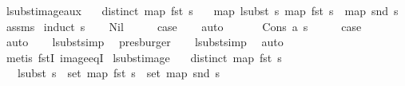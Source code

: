 \begin{isabellebody}
\isamarkupfalse%
%
\endisatagproof
{\isafoldproof}%
%
\isadelimproof
\isanewline
%
\endisadelimproof
\isanewline
\isanewline
{}\isamarkupfalse%
\ lsubst{\isacharunderscore}{\kern0pt}image{\isacharunderscore}{\kern0pt}aux{\isacharcolon}{\kern0pt}\isanewline
\ \ \ {\isachardoublequoteopen}distinct\ {\isacharparenleft}{\kern0pt}map\ fst\ s{\isacharparenright}{\kern0pt}{\isachardoublequoteclose}\isanewline
\ \ \ {\isachardoublequoteopen}map\ {\isacharparenleft}{\kern0pt}lsubst\ s{\isacharparenright}{\kern0pt}\ {\isacharparenleft}{\kern0pt}map\ fst\ s{\isacharparenright}{\kern0pt}\ {\isacharequal}{\kern0pt}\ map\ snd\ s{\isachardoublequoteclose}\isanewline
%
\isadelimproof
%
\endisadelimproof
%
\isatagproof
{}\isamarkupfalse%
\ assms\isanewline
{}\isamarkupfalse%
\ {\isacharparenleft}{\kern0pt}induct\ s{\isacharparenright}{\kern0pt}\isanewline
\ \ \isamarkupfalse%
\ Nil\isanewline
\ \ \isamarkupfalse%
\ \isamarkupfalse%
\ {\isacharquery}{\kern0pt}case\isanewline
\ \ \isamarkupfalse%
\ auto\isanewline
\ \ \isamarkupfalse%
\isanewline
{}\isamarkupfalse%
\isanewline
\ \ \isamarkupfalse%
\ {\isacharparenleft}{\kern0pt}Cons\ a\ s{\isacharparenright}{\kern0pt}\isanewline
\ \ \isamarkupfalse%
\ \isamarkupfalse%
\ {\isacharquery}{\kern0pt}case\isanewline
\ \ \isamarkupfalse%
\ auto\isanewline
\ \ \isamarkupfalse%
\ lsubst{\isacharunderscore}{\kern0pt}simp\ \isamarkupfalse%
\ presburger\isanewline
\ \ \isamarkupfalse%
\ lsubst{\isacharunderscore}{\kern0pt}simp\ \isamarkupfalse%
\ auto\isanewline
\ \ \isamarkupfalse%
\ {\isacharparenleft}{\kern0pt}metis\ fstI\ image{\isacharunderscore}{\kern0pt}eqI{\isacharparenright}{\kern0pt}\isanewline
{}\isamarkupfalse%
%
\endisatagproof
{\isafoldproof}%
%
\isadelimproof
\isanewline
%
\endisadelimproof
\isanewline
\isanewline
{}\isamarkupfalse%
\ lsubst{\isacharunderscore}{\kern0pt}image{\isacharcolon}{\kern0pt}\isanewline
\ \ \ {\isachardoublequoteopen}distinct\ {\isacharparenleft}{\kern0pt}map\ fst\ s{\isacharparenright}{\kern0pt}{\isachardoublequoteclose}\isanewline
\ \ \ {\isachardoublequoteopen}lsubst\ s\ {\isacharbackquote}{\kern0pt}\ set\ {\isacharparenleft}{\kern0pt}map\ fst\ s{\isacharparenright}{\kern0pt}\ {\isacharequal}{\kern0pt}\ set\ {\isacharparenleft}{\kern0pt}map\ snd\ s{\isacharparenright}{\kern0pt}{\isachardoublequoteclose}\isanewline

\end{isabellebody}
